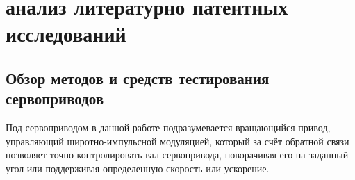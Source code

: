 

\section{анализ литературно патентных исследований}

\subsection{Обзор методов и средств тестирования сервоприводов}

Под сервоприводом в данной работе подразумевается вращающийся привод,
управляющий широтно-импульсной модуляцией, который за счёт обратной
связи позволяет точно контролировать вал сервопривода, поворачивая его
на заданный угол или поддерживая определенную скорость или ускорение.
